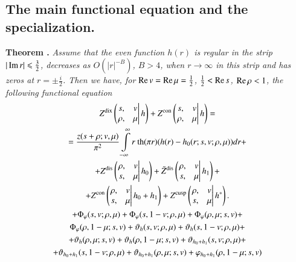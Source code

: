 \subsection{The main functional equation and the specialization.}\label{art7-subsec2.4}

\medskip
\noindent
{\bfseries Theorem .\label{art7-thm15}}
\textit{Assume that the even function $h(r)$ is regular in the strip $|\operatorname{Im} r| \leqslant \frac{3}{2}$, decreases as $O(|r|^{-B})$, $B>4$, when $r \to \infty$ in this strip and has zeros at $r =  \pm \frac{i}{2}$. Then we have, for $ \operatorname{Re} v = \operatorname{Re} \mu = \frac{1}{2}$, $\frac{1}{2} < \operatorname{Re} s$, $\operatorname{Re} \rho < 1$, the following functional equation}
\setcounter{section}{5}
\setcounter{equation}{0}
\begin{gather}
Z^{\text{dix}}
\left(
\left.
\begin{matrix}
s, & v \\
\rho, &  \mu
\end{matrix}
\right| h
\right) + Z^{\text{con}}
\left(
\left.
\begin{matrix}
s, & v \\
\rho, &  \mu
\end{matrix}
\right| h
\right) = \label{art7-eq5.1}\\
= \frac{z(s + \rho; v, \mu)}{\pi^2} \int\limits^\infty_{-\infty} r \text{ th} (\pi r) (h(r) -h_0 (r; s , v; \rho, \mu)) dr + \notag\\
+ Z^{\text{dis}}
\left(
\left.
\begin{matrix}
\rho, & v \\
s, & \mu
\end{matrix}
\right| h_0
\right) + \tilde{Z}^{\text{dis}}
\left(
\left.
\begin{matrix}
\rho, &v\\
s, & \mu
\end{matrix}
\right| h_1
\right) + \notag \\
+ Z^{\text{con}}  
\left(
\left.
\begin{matrix}
\rho, &v\\
s, & \mu
\end{matrix}
\right| h_0 + h_1
\right) + Z^{\text{cusp}}
\left(
\left.
\begin{matrix}
\rho, &v\\
s, & \mu
\end{matrix}
\right| h^\ast
\right). \notag\\
+ \Phi_\varphi (s, v; \rho, \mu) + \Phi_\varphi (s,  1-v; \rho, \mu) + \Phi_\varphi (\rho,\mu; s, v) + \notag\\
 \Phi_{\varphi} ( \rho , 1 - \mu; s, v) + \vartheta_h(s,v ; \rho, \mu) + \vartheta_h(s, 1- v ; \rho, \mu) + \notag\\
+ \vartheta_h(\rho, \mu; s, v) + \vartheta_h (\rho, 1 -\mu; s, v) + \vartheta_{h_0 + h_1} (s, v; \rho, \mu) +  \notag\\
+ \vartheta_{h_0 + h_1} (s, 1 - v; \rho, \mu) + \vartheta_{h_0 + h_1} (\rho, \mu; s, v) + \varphi_{h_0+ h_1} (\rho, 1- \mu; s, v) \notag
\end{gather}
